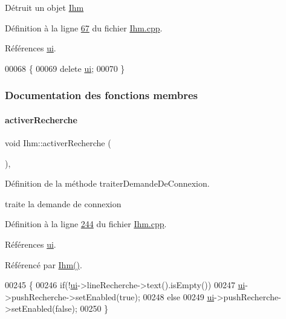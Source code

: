 Détruit un objet \hyperlink{class_ihm}{Ihm} 

Définition à la ligne \hyperlink{_ihm_8cpp_source_l00067}{67} du fichier \hyperlink{_ihm_8cpp_source}{Ihm.\+cpp}.



Références \hyperlink{_ihm_8h_source_l00099}{ui}.


\begin{DoxyCode}
00068 \{
00069     \textcolor{keyword}{delete} \hyperlink{class_ihm_a0ac5f47856566ceeeca1720109bf70ea}{ui};
00070 \}
\end{DoxyCode}


\subsubsection{Documentation des fonctions membres}
\mbox{\label{class_ihm_a3ef457d0b75d54ab131d97f7461daab6}} 
\paragraph{\texorpdfstring{activer\+Recherche}{activerRecherche}}
{\footnotesize\ttfamily void Ihm\+::activer\+Recherche (\begin{DoxyParamCaption}{ }\end{DoxyParamCaption})\hspace{0.3cm}{\ttfamily [private]}, {\ttfamily [slot]}}



Définition de la méthode traiter\+Demande\+De\+Connexion. 

traite la demande de connexion 

Définition à la ligne \hyperlink{_ihm_8cpp_source_l00244}{244} du fichier \hyperlink{_ihm_8cpp_source}{Ihm.\+cpp}.



Références \hyperlink{_ihm_8h_source_l00099}{ui}.



Référencé par \hyperlink{_ihm_8cpp_source_l00029}{Ihm()}.


\begin{DoxyCode}
00245 \{
00246     \textcolor{keywordflow}{if}(!\hyperlink{class_ihm_a0ac5f47856566ceeeca1720109bf70ea}{ui}->lineRecherche->text().isEmpty())
00247         \hyperlink{class_ihm_a0ac5f47856566ceeeca1720109bf70ea}{ui}->pushRecherche->setEnabled(\textcolor{keyword}{true});
00248     \textcolor{keywordflow}{else}
00249         \hyperlink{class_ihm_a0ac5f47856566ceeeca1720109bf70ea}{ui}->pushRecherche->setEnabled(\textcolor{keyword}{false});
00250 \}
\end{DoxyCode}
\mbox{\label{class_ihm_aca73421fd372dc490c12f77e3bbdf00c}} 
